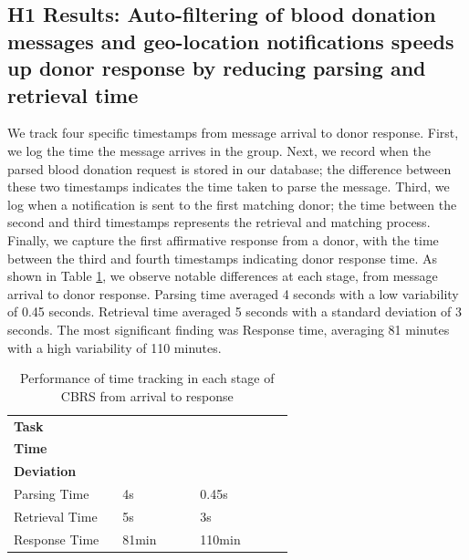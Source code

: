 \documentclass[11pt]{article}
\begin{document}
\subsection{H1 Results: Auto-filtering of blood donation messages and geo-location notifications speeds up donor response by reducing parsing and retrieval time }
We track four specific timestamps from message arrival to donor response. First, we log the time the message arrives in the group. Next, we record when the parsed blood donation request is stored in our database; the difference between these two timestamps indicates the time taken to parse the message. Third, we log when a notification is sent to the first matching donor; the time between the second and third timestamps represents the retrieval and matching process. Finally, we capture the first affirmative response from a donor, with the time between the third and fourth timestamps indicating donor response time.
As shown in Table \ref{tab:time}, we observe notable differences at each stage, from message arrival to donor response. Parsing time averaged 4 seconds with a low variability of 0.45 seconds. Retrieval time averaged 5 seconds with a standard deviation of 3 seconds. The most significant finding was Response time, averaging 81 minutes with a high variability of 110 minutes.



\begin{table}[h]
\centering
\caption{Performance of time tracking in each stage of CBRS from arrival to response}
\small
\begin{tabular}{@{}p{0.35\linewidth}p{0.25\linewidth}p{0.3\linewidth}@{}}
\toprule
\textbf{Task} & \makecell[l]{\textbf{Average}\\\textbf{Time}} & \makecell[l]{\textbf{Standard}\\\textbf{Deviation}} \\ \midrule
Parsing Time   & 4s     & 0.45s  \\
Retrieval Time & 5s     & 3s     \\
Response Time  & 81min  & 110min \\
\bottomrule
\end{tabular}
\label{tab:time}
\end{table}
\end{document}
